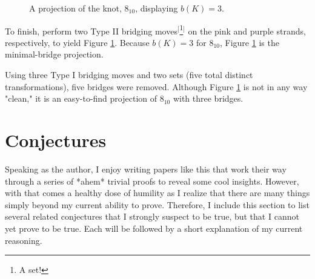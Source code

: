 \documentclass[titlepage]{article}
\begin{document}
\begin{figure}[h!]
    \vspace{-0.8em}
    \caption{A projection of the knot, $8_{10}$, displaying $b(K)=3$.}
    \label{fig:810fin}
\end{figure}

To finish, perform two Type II bridging moves$^[$\footnote{A set!}$^]$ on the \textcolor{max}{pink} and \textcolor{pux}{purple} strands, respectively, to yield Figure \ref{fig:810fin}. Because $b(K)=3$ for $8_{10}$, Figure \ref{fig:810fin} is the minimal-bridge projection.\par
Using three Type I bridging moves and two sets (five total distinct transformations), five bridges were removed. Although Figure \ref{fig:810fin} is not in any way "clean," it is an easy-to-find projection of $8_{10}$ with three bridges.
\newpage



\section{Conjectures}
Speaking as the author, I enjoy writing papers like this that work their way through a series of *ahem* trivial proofs to reveal some cool insights. However, with that comes a healthy dose of humility as I realize that there are many things simply beyond my current ability to prove. Therefore, I include this section to list several related conjectures that I strongly suspect to be true, but that I cannot yet prove to be true. Each will be followed by a short explanation of my current reasoning.
\end{document}
